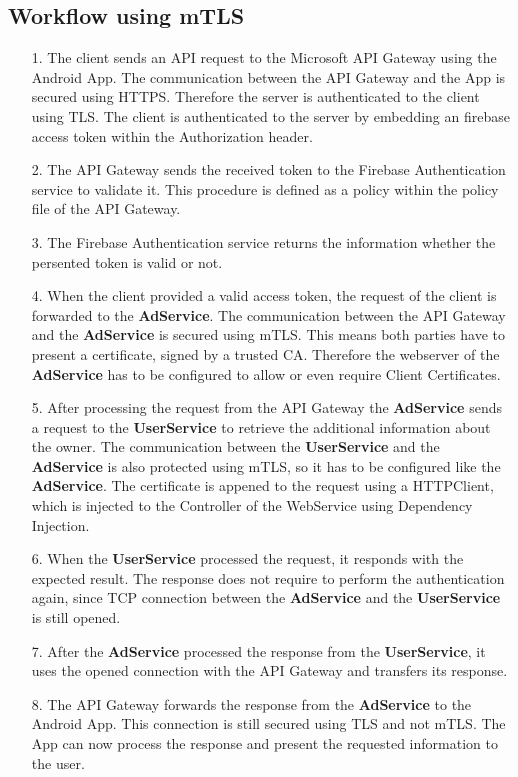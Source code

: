\subsection{Workflow using mTLS}
\begin{enumerate}
	\item[1.] The client sends an API request to the Microsoft API Gateway using the Android App.
		The communication between the API Gateway and the App is secured using HTTPS.
		Therefore the server is authenticated to the client using TLS.
		The client is authenticated to the server by embedding an firebase access token within the Authorization header.
	\item[2.] The API Gateway sends the received token to the Firebase Authentication service to validate it.
		This procedure is defined as a policy within the policy file of the API Gateway.
		\\
	\item[3.] The Firebase Authentication service returns the information whether the persented token is valid or not.
	\item[4.] When the client provided a valid access token, the request of the client is forwarded to the \textbf{AdService}.
		The communication between the API Gateway and the \textbf{AdService} is secured using mTLS.
		This means both parties have to present a certificate, signed by a trusted CA.
		Therefore the webserver of the \textbf{AdService} has to be configured to allow or even require Client Certificates.
	\item[5.] After processing the request from the API Gateway the \textbf{AdService} sends a request to the \textbf{UserService} to retrieve the additional information about the owner.
		The communication between the \textbf{UserService} and the \textbf{AdService} is also protected using mTLS, so it has to be configured like the \textbf{AdService}.
		The certificate is appened to the request using a HTTPClient, which is injected to the Controller of the WebService using Dependency Injection.
	\item[6.] When the \textbf{UserService} processed the request, it responds with the expected result.
		The response does not require to perform the authentication again, since TCP connection between the \textbf{AdService} and the \textbf{UserService} is still opened.
	\item[7.] After the \textbf{AdService} processed the response from the \textbf{UserService}, it uses the opened connection with the API Gateway and transfers its response.
	\item[8.] The API Gateway forwards the response from the \textbf{AdService} to the Android App.
		This connection is still secured using TLS and not mTLS.
		The App can now process the response and present the requested information to the user.
\end{enumerate}

